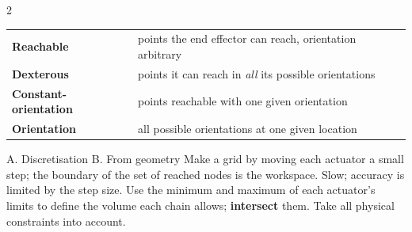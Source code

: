 \begin{multicols}{2}
\begin{fbx}
\begin{tabularx}{\linewidth}{@{}lX@{}}\toprule
\textbf{Reachable} & points the end effector can reach, orientation arbitrary\\
\textbf{Dexterous} & points it can reach in \emph{all} its possible orientations\\
\textbf{Constant-orientation} & points reachable with one given orientation\\
\textbf{Orientation} & all possible orientations at one given location\\\bottomrule
\end{tabularx}
\end{fbx}
\begin{twoway}{A. Discretisation }{B. From geometry }
Make a grid by moving each actuator a small step; the boundary of the set of reached nodes is the workspace. Slow; accuracy is limited by the step size.
\tcblower
Use the minimum and maximum of each actuator's limits to define the volume each chain allows; \textbf{intersect} them. Take all physical constraints into account.
\end{twoway}


\end{multicols}
